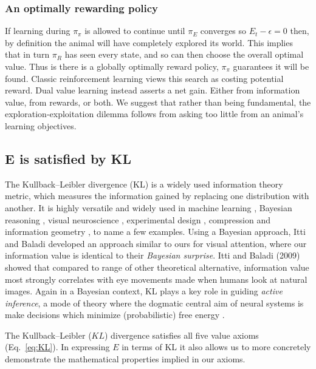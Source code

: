 \documentclass[9pt,twocolumn,twoside]{pnas-new}
\begin{document}
\subsubsection*{An optimally rewarding policy}
If learning during $\pi_{\pi}$ is allowed to continue until $\pi_E$ converges so $E_t - \epsilon = 0$ then, by definition the animal will have completely explored its world. This implies that in turn $\pi_R$ has seen every state, and so can then choose the overall optimal value. Thus is there is a globally optimally reward policy, $\pi_{\pi}$ guarantees it will be found. Classic reinforcement learning views this search as costing potential reward. Dual value learning instead asserts a net gain. Either from information value, from rewards, or both. We suggest that rather than being fundamental, the exploration-exploitation dilemma follows from asking too little from an animal's learning objectives.

\subsection*{E is satisfied by KL}
The Kullback--Leibler divergence (KL) is a widely used information theory metric, which measures the information gained by replacing one distribution with another. It is highly versatile and widely used in machine learning \cite{Goodfellow-et-al-2016}, Bayesian reasoning \cite{Itti2009,Friston2016}, visual neuroscience \cite{Itti2009}, experimental design \cite{Lopez-Fidalgo2007}, compression \cite{Mackay,Still2012} and information geometry \cite{Ay2015}, to name a few examples. Using a Bayesian approach, Itti and Baladi \citep{Itti2009} developed an approach similar to ours for visual attention, where our information value is identical to their \textit{Bayesian surprise}. Itti and Baladi (2009) showed that compared to range of other theoretical alternative, information value most strongly correlates with eye movements made when humans look at natural images. Again in a Bayesian context, KL plays a key role in guiding \textit{active inference}, a mode of theory where the dogmatic central aim of neural systems is make decisions which minimize (probabilistic) free energy \cite{Friston2016}.

The Kullback--Leibler ($KL$) divergence satisfies all five value axioms (Eq.~\ref{eq:KL}). In expressing $E$ in terms of KL it also allows us to more concretely demonstrate the mathematical properties implied in our axioms.
 
\end{document}
